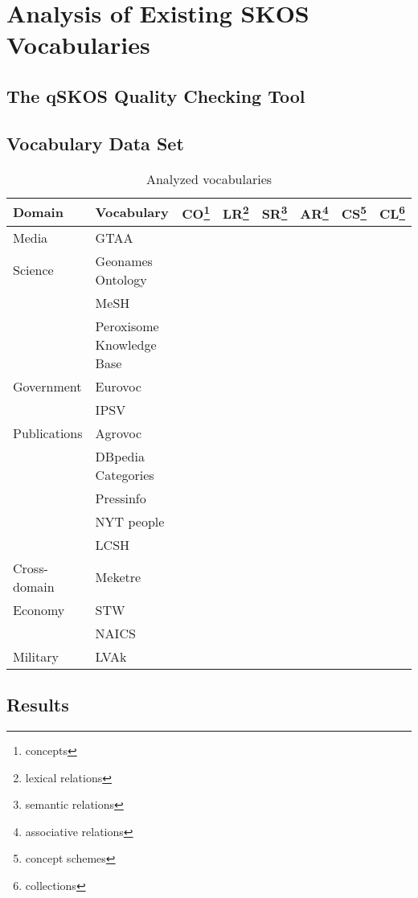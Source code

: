 
\section{Analysis of Existing SKOS Vocabularies}\label{sec:analysis}

\subsection{The qSKOS Quality Checking Tool}


\subsection{Vocabulary Data Set}
\begin{table}[h]
\caption{Analyzed vocabularies}
\begin{tabular}{|p{2cm}|p{6cm}|p{1.5cm}|p{.8cm}|p{.8cm}|p{.8cm}|p{.8cm}|p{.8cm}|}
\hline
\textbf{Domain} & \textbf{Vocabulary} & \textbf{CO\footnote{concepts}} & \textbf{LR\footnote{lexical relations}} & \textbf{SR\footnote{semantic relations}} & \textbf{AR\footnote{associative relations}} & \textbf{CS\footnote{concept schemes}} & \textbf{CL\footnote{collections}}\\
\hline
Media & GTAA & & & & & & \\
\hline
Science & Geonames Ontology &&&&&& \\
\hline
& MeSH &&&&&& \\
\hline
& Peroxisome Knowledge Base &&&&&& \\
\hline
Government & Eurovoc &&&&&& \\
\hline
& IPSV &&&&&& \\
\hline
Publications & Agrovoc &&&&&& \\
\hline
& DBpedia Categories &&&&&& \\
\hline
& Pressinfo &&&&&& \\
\hline
& NYT people &&&&&& \\
\hline
& LCSH &&&&&& \\
\hline
Cross-domain & Meketre &&&&&& \\
\hline
Economy & STW &&&&&& \\
\hline
& NAICS &&&&&& \\
\hline
Military & LVAk &&&&&&
\\
\hline

\end{tabular}
\end{table}


\subsection{Results}


